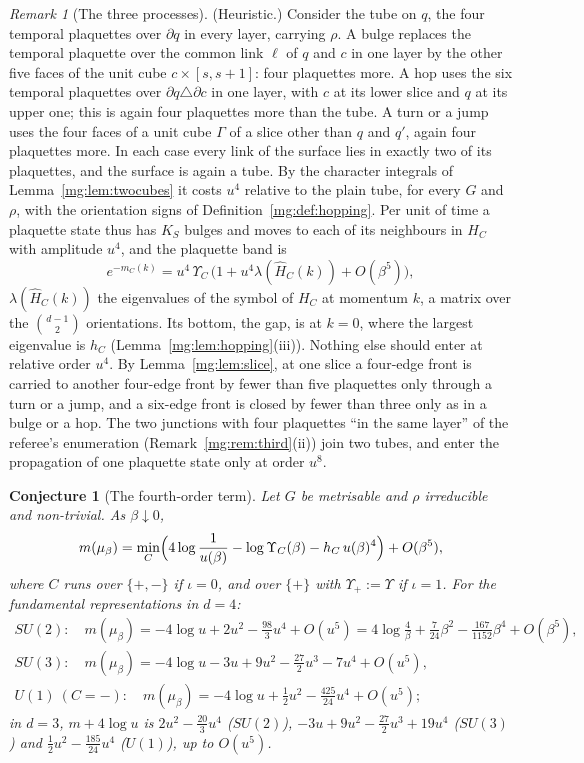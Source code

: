 \documentclass[11pt,a4paper]{article}
\newtheorem{conjecture}[theorem]{Conjecture}
\theoremstyle{definition}
\theoremstyle{remark}
\newtheorem{remark}[theorem]{Remark}
\begin{document}
\begin{remark}[The three processes]\label{mg:rem:processes}
(Heuristic.) Consider the tube on $q$, the four temporal plaquettes over $\partial q$ in every layer, carrying $\rho$. A bulge replaces the temporal plaquette
over the common link $\ell$ of $q$ and $c$ in one layer by the other five faces of the unit cube $c\times[s,s+1]$: four plaquettes more. A hop uses the six
temporal plaquettes over $\partial q\triangle\partial c$ in one layer, with $c$ at its lower slice and $q$ at its upper one; this is again four plaquettes more
than the tube. A turn or a jump uses the four faces of a unit cube $\Gamma$ of a slice other than $q$ and $q'$, again four plaquettes more. In each case every
link of the surface lies in exactly two of its plaquettes, and the surface is again a tube. By the character integrals of Lemma~\ref{mg:lem:twocubes} it
costs $u^4$ relative to the plain tube, for every $G$ and $\rho$, with the orientation signs of Definition~\ref{mg:def:hopping}. Per unit of time a
plaquette state thus has $K_S$ bulges and moves to each of its neighbours in $H_C$ with amplitude $u^4$, and the plaquette band is
\[
e^{-m_C(k)}=u^4\,\Upsilon_C\,\bigl(1+u^4\lambda(\hat H_C(k))+O(\beta^5)\bigr),
\]
$\lambda(\hat H_C(k))$ the eigenvalues of the symbol of $H_C$ at momentum $k$, a matrix over the $\binom{d-1}2$ orientations. Its bottom, the gap, is at $k=0$,
where the largest eigenvalue is $h_C$ (Lemma~\ref{mg:lem:hopping}(iii)). Nothing else should enter at relative order $u^4$. By Lemma~\ref{mg:lem:slice},
at one slice a four-edge front is carried to another four-edge front by fewer than five plaquettes only through a turn or a jump, and a six-edge front is
closed by fewer than three only as in a bulge or a hop. The two junctions with four plaquettes ``in the same layer'' of the referee's enumeration
(Remark~\ref{mg:rem:third}(ii)) join two tubes, and enter the propagation of one plaquette state only at order $u^8$.
\end{remark}

\begin{conjecture}[The fourth-order term]\label{mg:conj:fourth}
Let $G$ be metrisable and $\rho$ irreducible and non-trivial. As $\beta\downarrow0$,
\[
m(\mu_\beta)=\min_C\Bigl(4\log\frac1{u(\beta)}-\log\Upsilon_C(\beta)-h_C\,u(\beta)^4\Bigr)+O(\beta^5),
\]
where $C$ runs over $\{+,-\}$ if $\iota=0$, and over $\{+\}$ with $\Upsilon_+:=\Upsilon$ if $\iota=1$. For the fundamental representations in $d=4$:
\begin{gather*}
SU(2):\quad m(\mu_\beta)=-4\log u+2u^2-\tfrac{98}3u^4+O(u^5)=4\log\tfrac4\beta+\tfrac7{24}\beta^2-\tfrac{167}{1152}\beta^4+O(\beta^5),\\
SU(3):\quad m(\mu_\beta)=-4\log u-3u+9u^2-\tfrac{27}2u^3-7u^4+O(u^5),\\
U(1)\ (C=-):\quad m(\mu_\beta)=-4\log u+\tfrac12u^2-\tfrac{425}{24}u^4+O(u^5);
\end{gather*}
in $d=3$, $m+4\log u$ is $2u^2-\frac{20}3u^4$ ($SU(2)$), $-3u+9u^2-\frac{27}2u^3+19u^4$ ($SU(3)$) and $\frac12u^2-\frac{185}{24}u^4$ ($U(1)$), up to $O(u^5)$.
\end{conjecture}
\end{document}
